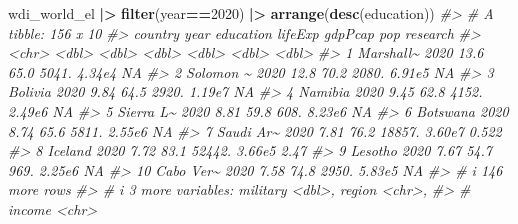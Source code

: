 \documentclass[
  xelatex, ja=standard]{bxjsbook}
\newenvironment{Shaded}{\begin{snugshade}}{\end{snugshade}}
\newcommand{\CommentTok}[1]{\textcolor[rgb]{0.56,0.35,0.01}{\textit{#1}}}
\newcommand{\DecValTok}[1]{\textcolor[rgb]{0.00,0.00,0.81}{#1}}
\newcommand{\FunctionTok}[1]{\textcolor[rgb]{0.13,0.29,0.53}{\textbf{#1}}}
\newcommand{\NormalTok}[1]{#1}
\newcommand{\SpecialCharTok}[1]{\textcolor[rgb]{0.81,0.36,0.00}{\textbf{#1}}}
\theoremstyle{definition}
\theoremstyle{definition}
\theoremstyle{definition}
\theoremstyle{definition}
\theoremstyle{remark}
\begin{document}
\begin{Shaded}
\begin{Highlighting}[]
\NormalTok{wdi\_world\_el }\SpecialCharTok{|\textgreater{}} \FunctionTok{filter}\NormalTok{(year}\SpecialCharTok{==}\DecValTok{2020}\NormalTok{) }\SpecialCharTok{|\textgreater{}} \FunctionTok{arrange}\NormalTok{(}\FunctionTok{desc}\NormalTok{(education))}
\CommentTok{\#\textgreater{} \# A tibble: 156 x 10}
\CommentTok{\#\textgreater{}    country    year education lifeExp gdpPcap    pop research}
\CommentTok{\#\textgreater{}    \textless{}chr\textgreater{}     \textless{}dbl\textgreater{}     \textless{}dbl\textgreater{}   \textless{}dbl\textgreater{}   \textless{}dbl\textgreater{}  \textless{}dbl\textgreater{}    \textless{}dbl\textgreater{}}
\CommentTok{\#\textgreater{}  1 Marshall\textasciitilde{}  2020     13.6     65.0   5041. 4.34e4   NA    }
\CommentTok{\#\textgreater{}  2 Solomon \textasciitilde{}  2020     12.8     70.2   2080. 6.91e5   NA    }
\CommentTok{\#\textgreater{}  3 Bolivia    2020      9.84    64.5   2920. 1.19e7   NA    }
\CommentTok{\#\textgreater{}  4 Namibia    2020      9.45    62.8   4152. 2.49e6   NA    }
\CommentTok{\#\textgreater{}  5 Sierra L\textasciitilde{}  2020      8.81    59.8    608. 8.23e6   NA    }
\CommentTok{\#\textgreater{}  6 Botswana   2020      8.74    65.6   5811. 2.55e6   NA    }
\CommentTok{\#\textgreater{}  7 Saudi Ar\textasciitilde{}  2020      7.81    76.2  18857. 3.60e7    0.522}
\CommentTok{\#\textgreater{}  8 Iceland    2020      7.72    83.1  52442. 3.66e5    2.47 }
\CommentTok{\#\textgreater{}  9 Lesotho    2020      7.67    54.7    969. 2.25e6   NA    }
\CommentTok{\#\textgreater{} 10 Cabo Ver\textasciitilde{}  2020      7.58    74.8   2950. 5.83e5   NA    }
\CommentTok{\#\textgreater{} \# i 146 more rows}
\CommentTok{\#\textgreater{} \# i 3 more variables: military \textless{}dbl\textgreater{}, region \textless{}chr\textgreater{},}
\CommentTok{\#\textgreater{} \#   income \textless{}chr\textgreater{}}
\end{Highlighting}
\end{Shaded}
\end{document}
